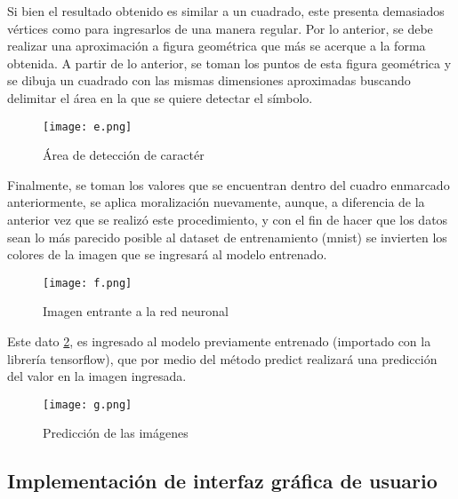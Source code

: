 \documentclass[journal]{IEEEtran}
\begin{document}
Si bien el resultado obtenido es similar a un cuadrado, este presenta demasiados vértices como para ingresarlos de una manera regular. Por lo anterior, se debe realizar una aproximación a figura geométrica que más se acerque a la forma obtenida. A partir de lo anterior, se toman los puntos de esta figura geométrica y se dibuja un cuadrado con las mismas dimensiones aproximadas buscando delimitar el área en la que se quiere detectar el símbolo.\\
\begin{figure} [H]
    \centering
    \texttt{[image: e.png]}
    \caption{Área de detección de caractér}
    \label{e}
\end{figure}
 
Finalmente, se toman los valores que se encuentran dentro del cuadro enmarcado anteriormente, se aplica moralización nuevamente, aunque, a diferencia de la anterior vez que se realizó este procedimiento, y con el fin de hacer que los datos sean lo más parecido posible al dataset de entrenamiento (mnist) se invierten los colores de la imagen que se ingresará al modelo entrenado.
\begin{figure} [H]
    \centering
    \texttt{[image: f.png]}
    \caption{Imagen entrante a la red neuronal}
    \label{f}
\end{figure}
 
Este dato \ref{f}, es ingresado al modelo previamente entrenado (importado con la librería tensorflow), que por medio del método predict realizará una predicción del valor en la imagen ingresada.

\begin{figure} [H]
    \centering
    \texttt{[image: g.png]}
    \caption{Predicción de las imágenes}
    \label{g}
\end{figure}


\subsection{Implementación de interfaz gráfica de usuario}
\end{document}
